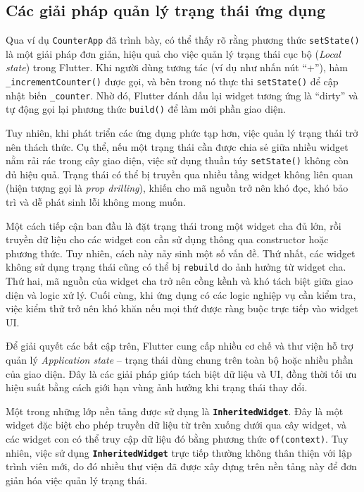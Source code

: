 \documentclass[../DoAn.tex]{subfiles}
\numberwithin{figure}{chapter}
\begin{document}
\subsection{Các giải pháp quản lý trạng thái ứng dụng}
Qua ví dụ \texttt{CounterApp} đã trình bày, có thể thấy rõ rằng phương thức \texttt{setState()} là một giải pháp đơn giản, hiệu quả cho việc quản lý trạng thái cục bộ (\textit{Local state}) trong Flutter. Khi người dùng tương tác (ví dụ như nhấn nút “+”), hàm \texttt{\_incrementCounter()} được gọi, và bên trong nó thực thi \texttt{setState()} để cập nhật biến \texttt{\_counter}. Nhờ đó, Flutter đánh dấu lại widget tương ứng là “dirty” và tự động gọi lại phương thức \texttt{build()} để làm mới phần giao diện.

Tuy nhiên, khi phát triển các ứng dụng phức tạp hơn, việc quản lý trạng thái trở nên thách thức. Cụ thể, nếu một trạng thái cần được chia sẻ giữa nhiều widget nằm rải rác trong cây giao diện, việc sử dụng thuần túy \texttt{setState()} không còn đủ hiệu quả. Trạng thái có thể bị truyền qua nhiều tầng widget không liên quan (hiện tượng gọi là \textit{prop drilling}), khiến cho mã nguồn trở nên khó đọc, khó bảo trì và dễ phát sinh lỗi không mong muốn.

Một cách tiếp cận ban đầu là đặt trạng thái trong một widget cha đủ lớn, rồi truyền dữ liệu cho các widget con cần sử dụng thông qua constructor hoặc phương thức. Tuy nhiên, cách này nảy sinh một số vấn đề. Thứ nhất, các widget không sử dụng trạng thái cũng có thể bị \texttt{rebuild} do ảnh hưởng từ widget cha. Thứ hai, mã nguồn của widget cha trở nên cồng kềnh và khó tách biệt giữa giao diện và logic xử lý. Cuối cùng, khi ứng dụng có các logic nghiệp vụ cần kiểm tra, việc kiểm thử trở nên khó khăn nếu mọi thứ được ràng buộc trực tiếp vào widget UI.

Để giải quyết các bất cập trên, Flutter cung cấp nhiều cơ chế và thư viện hỗ trợ quản lý \textit{Application state} – trạng thái dùng chung trên toàn bộ hoặc nhiều phần của giao diện. Đây là các giải pháp giúp tách biệt dữ liệu và UI, đồng thời tối ưu hiệu suất bằng cách giới hạn vùng ảnh hưởng khi trạng thái thay đổi.

Một trong những lớp nền tảng được sử dụng là \textbf{\texttt{InheritedWidget}}. Đây là một widget đặc biệt cho phép truyền dữ liệu từ trên xuống dưới qua cây widget, và các widget con có thể truy cập dữ liệu đó bằng phương thức \texttt{of(context)}. Tuy nhiên, việc sử dụng \textbf{\texttt{InheritedWidget}} trực tiếp thường không thân thiện với lập trình viên mới, do đó nhiều thư viện đã được xây dựng trên nền tảng này để đơn giản hóa việc quản lý trạng thái.
\end{document}
